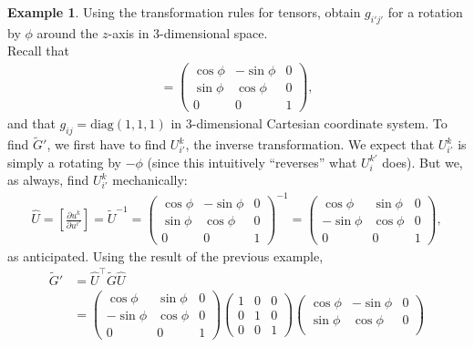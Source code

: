 \documentclass{book}
\theoremstyle{definition}
\newtheorem{exmp}{Example}[section]
\begin{document}
\begin{exmp}
	Using the transformation rules for tensors, obtain $g_{i'j'}$ for a rotation by $\phi$ around the $z$-axis in 3-dimensional space. \\
	
	Recall that
	\begin{align*}
	[U^{j'}_i] = 
	\begin{pmatrix}
	\cos\phi & -\sin\phi & 0\\
	\sin\phi & \cos\phi & 0 \\
	0 & 0 & 1
	\end{pmatrix},
	\end{align*}
	and that $g_{ij} = \text{diag}(1,1,1)$ in 3-dimensional Cartesian coordinate system. To find $\tilde{G}'$, we first have to find $U^k_{i'}$, the inverse transformation. We expect that $U^k_{i'}$ is simply a rotating by $-\phi$ (since this intuitively ``reverses'' what $U^{k'}_{i}$ does). But we, as always, find $U^k_{i'}$ mechanically:
	\begin{align*}
	\hat{U} = \left[\frac{\partial u^k}{\partial u^{i'}} \right]  =\tilde{U}^{-1} = 
	\begin{pmatrix}
	\cos\phi & -\sin\phi & 0\\
	\sin\phi & \cos\phi & 0 \\
	0 & 0 & 1
	\end{pmatrix}^{-1}
	=
	\begin{pmatrix}
	\cos\phi & \sin\phi & 0\\
	-\sin\phi & \cos\phi & 0 \\
	0 & 0 & 1
	\end{pmatrix},
	\end{align*} 
	as anticipated. Using the result of the previous example,
	\begin{align*}
	\tilde{G}' &= \hat{U}^{\top}\tilde{G}\hat{U}\\
	&= \begin{pmatrix}
	\cos\phi & \sin\phi & 0\\
	-\sin\phi & \cos\phi & 0 \\
	0 & 0 & 1
	\end{pmatrix}
	\begin{pmatrix}
	1 & 0 & 0\\
	0 & 1 & 0\\
	0 & 0 & 1
	\end{pmatrix}
	\begin{pmatrix}
	\cos\phi & -\sin\phi & 0\\
	\sin\phi & \cos\phi & 0 \\

\end{pmatrix}
\end{align*}
\end{exmp}
\end{document}
